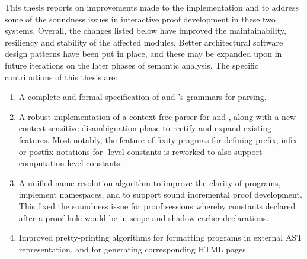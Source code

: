 

This thesis reports on improvements made to the implementation \Beluga and \Harpoon to address some of the soundness issues in interactive proof development in these two systems.
Overall, the changes listed below have improved the maintainability, resiliency and stability of the affected modules.
Better architectural software design patterns have been put in place, and these may be expanded upon in future iterations on the later phases of semantic analysis.
The specific contributions of this thesis are:
\begin{enumerate}
\item
A complete and formal specification of \Beluga and \Harpoon's grammars for parsing.
\item
A robust implementation of a context-free parser for \Beluga and \Harpoon, along with a new context-sensitive disambiguation phase to rectify and expand existing features.
Most notably, the \Beluga feature of fixity pragmas for defining prefix, infix or postfix notations for \LF-level constants is reworked to also support computation-level constants.
\item
A unified name resolution algorithm to improve the clarity of \Beluga programs, implement namespaces, and to support sound incremental proof development.
This fixed the soundness issue for \Harpoon proof sessions whereby constants declared after a proof hole would be in scope and shadow earlier declarations.
\item
Improved pretty-printing algorithms for formatting \Beluga programs in external \ac{AST} representation, and for generating corresponding \textsc{HTML} pages.
\end{enumerate}

